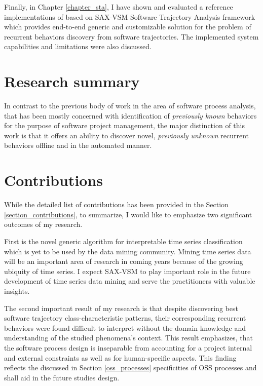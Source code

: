 Finally, in Chapter \ref{chapter_sta}, I have shown and evaluated a reference implementations of based on SAX-VSM Software Trajectory Analysis framework which provides end-to-end generic and customizable solution for the problem of recurrent behaviors discovery from software trajectories. The implemented system capabilities and limitations were also discussed.

\section{Research summary}
In contrast to the previous body of work in the area of software process analysis, that has been mostly concerned with identification of \textit{previously known} behaviors for the purpose of software project management, the major distinction of this work is that it offers an ability to discover novel, \textit{previously unknown} recurrent behaviors offline and in the automated manner.

\section{Contributions}
While the detailed list of contributions has been provided in the Section \ref{section_contributions}, to summarize, I would like to emphasize two significant outcomes of my research.

First is the novel generic algorithm for interpretable time series classification which is yet to be used by the data mining community. Mining time series data will be an important area of research in coming years because of the growing ubiquity of time series. I expect SAX-VSM to play important role in the future development of time series data mining and serve the practitioners with valuable insights.

The second important result of my research is that despite discovering best software trajectory class-characteristic patterns, their corresponding recurrent behaviors were found difficult to interpret without the domain knowledge and understanding of the studied phenomena's context. This result emphasizes, that the software process design is inseparable from accounting for a project internal and external constraints as well as for human-specific aspects. This finding reflects the discussed in Section \ref{oss_processes} specificities of OSS processes and shall aid in the future studies design.

